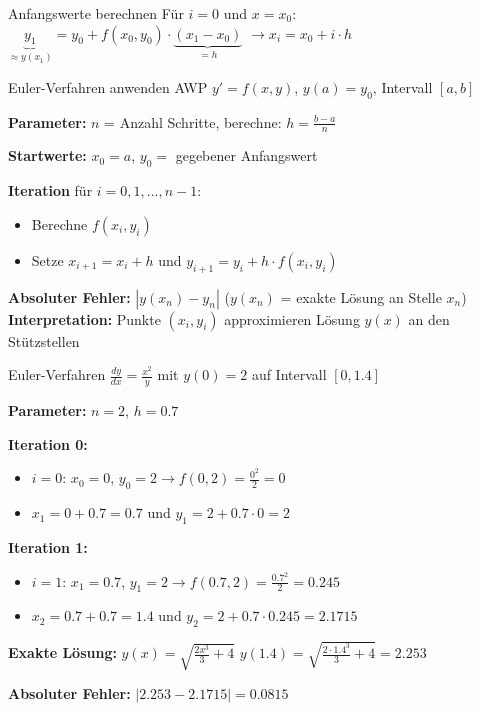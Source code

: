 \begin{theorem}{Anfangswerte berechnen} Für $i=0$ und $x=x_0$: \\
  $\underbrace{y_1}_{\approx y(x_1)}=y_0+f(x_0,y_0)\cdot\underbrace{(x_1-x_0)}_{=h}$
  $\rightarrow x_i = x_0 + i \cdot h$
\end{theorem}



\begin{KR}{Euler-Verfahren anwenden}
AWP $y' = f(x,y)$, $y(a) = y_0$, Intervall $[a,b]$

\textbf{Parameter:}
$n$ = Anzahl Schritte, berechne: $h = \frac{b-a}{n}$

\textbf{Startwerte:}
$x_0 = a$, $y_0 = $ gegebener Anfangswert

\textbf{Iteration}
für $i = 0, 1, ..., n-1$:
\begin{itemize}
    \item Berechne $f(x_i, y_i)$
    \item Setze $x_{i+1} = x_i + h$ und $y_{i+1} = y_i + h \cdot f(x_i, y_i)$
\end{itemize}
\textbf{Absoluter Fehler:}
$|y(x_n) - y_n|$ ($y(x_n)$ = exakte Lösung an Stelle $x_n$)
\vspace{1mm}\\
\small
\textbf{Interpretation:}
Punkte $(x_i, y_i)$ approximieren Lösung $y(x)$ an den Stützstellen
\end{KR}

\begin{example2}{Euler-Verfahren}
$\frac{dy}{dx} = \frac{x^2}{y}$ mit $y(0) = 2$ auf Intervall $[0, 1.4]$ 

\textbf{Parameter:} $n = 2$, $h = 0.7$

\textbf{Iteration 0:}
\begin{itemize}
    \item $i = 0$: $x_0 = 0$, $y_0 = 2 \rightarrow f(0, 2) = \frac{0^2}{2} = 0$
    \item $x_1 = 0 + 0.7 = 0.7$ und $y_1 = 2 + 0.7 \cdot 0 = 2$
\end{itemize}
\textbf{Iteration 1:}
\begin{itemize}
    \item $i = 1$: $x_1 = 0.7$, $y_1 = 2 \rightarrow f(0.7, 2) = \frac{0.7^2}{2} = 0.245$
    \item $x_2 = 0.7 + 0.7 = 1.4$ und $y_2 = 2 + 0.7 \cdot 0.245 = 2.1715$
\end{itemize}

\textbf{Exakte Lösung:} $y(x) = \sqrt{\frac{2x^3}{3} + 4}$
$y(1.4) = \sqrt{\frac{2 \cdot 1.4^3}{3} + 4} = 2.253$

\textbf{Absoluter Fehler:} $|2.253 - 2.1715| = 0.0815$
\end{example2}

